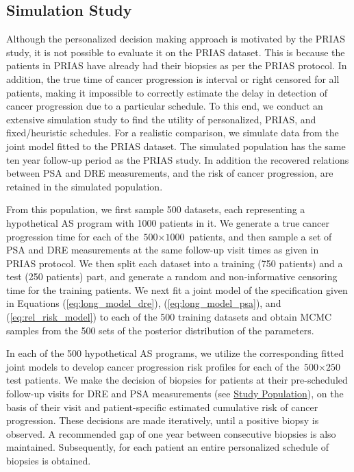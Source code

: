 \subsection{Simulation Study}
\label{subsec:sim_study}
Although the personalized decision making approach is motivated by the PRIAS study, it is not possible to evaluate it on the PRIAS dataset. This is because the patients in PRIAS have already had their biopsies as per the PRIAS protocol. In addition, the true time of cancer progression is interval or right censored for all patients, making it impossible to correctly estimate the delay in detection of cancer progression due to a particular schedule. To this end, we conduct an extensive simulation study to find the utility of personalized, PRIAS, and fixed/heuristic schedules. For a realistic comparison, we simulate data from the joint model fitted to the PRIAS dataset. The simulated population has the same ten year follow-up period as the PRIAS study. In addition the recovered relations between PSA and DRE measurements, and the risk of cancer progression, are retained in the simulated population.

From this population, we first sample 500 datasets, each representing a hypothetical AS program with 1000 patients in it. We generate a true cancer progression time for each of the ${\mbox{500} \times \mbox{1000}}$ patients, and then sample a set of PSA and DRE measurements at the same follow-up visit times as given in PRIAS protocol. We then split each dataset into a training (750 patients) and a test (250 patients) part, and generate a random and non‐informative censoring time for the training patients. We next fit a joint model of the specification given in Equations (\ref{eq:long_model_dre}), (\ref{eq:long_model_psa}), and (\ref{eq:rel_risk_model}) to each of the 500 training datasets and obtain MCMC samples from the 500 sets of the posterior distribution of the parameters. 

In each of the 500 hypothetical AS programs, we utilize the corresponding fitted joint models to develop cancer progression risk profiles for each of the ${\mbox{500} \times \mbox{250}}$ test patients. We make the decision of biopsies for patients at their pre-scheduled follow-up visits for DRE and PSA measurements (see \hyperref[subsec:study_population]{Study Population}), on the basis of their visit and patient-specific estimated cumulative risk of cancer progression. These decisions are made iteratively, until a positive biopsy is observed. A recommended gap of one year between consecutive biopsies\cite{bokhorst2015compliance} is also maintained. Subsequently, for each patient an entire personalized schedule of biopsies is obtained.

